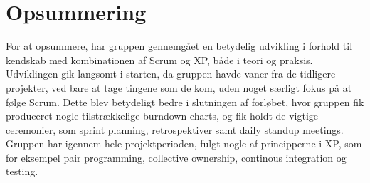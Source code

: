 \section{Opsummering}
For at opsummere, har gruppen gennemgået en betydelig udvikling i forhold til kendskab med kombinationen af
Scrum og XP, både i teori og praksis. Udviklingen gik langsomt i starten, da gruppen havde vaner fra de
tidligere projekter, ved bare at tage tingene som de kom, uden noget særligt fokus på at følge Scrum. Dette blev betydeligt
bedre i slutningen af forløbet, hvor gruppen fik produceret nogle tilstrækkelige burndown charts, og fik holdt de vigtige ceremonier,
som sprint planning, retrospektiver samt daily standup meetings. \\

Gruppen har igennem hele projektperioden, fulgt nogle af principperne i XP, som for eksempel pair programming, collective ownership, continous integration
og testing.